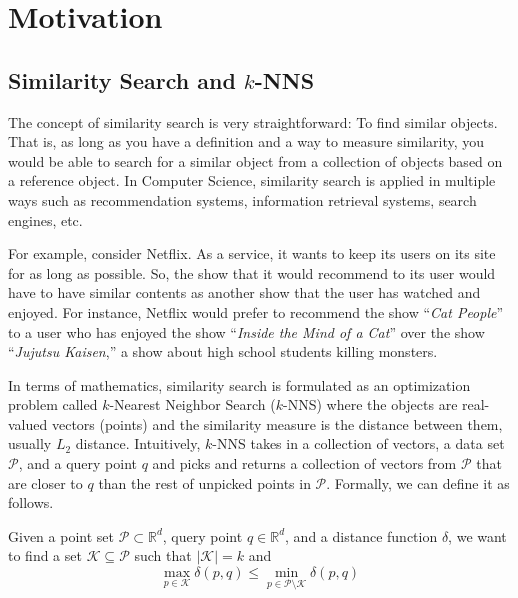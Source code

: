 \chapter{Motivation}

\section{Similarity Search and \(k\)-NNS}

The concept of similarity search is very straightforward: To find similar objects. That is, as long as you have a definition and a way to measure similarity, you would be able to search for a similar object from a collection of objects based on a reference object. In Computer Science, similarity search is applied in multiple ways such as recommendation systems, information retrieval systems, search engines, etc.

For example, consider Netflix. As a service, it wants to keep its users on its site for as long as possible. So, the show that it would recommend to its user would have to have similar contents as another show that the user has watched and enjoyed. For instance, Netflix would prefer to recommend the show ``\textit{Cat People}'' to a user who has enjoyed the show ``\textit{Inside the Mind of a Cat}'' over the show ``\textit{Jujutsu Kaisen},'' a show about high school students killing monsters.

In terms of mathematics, similarity search is formulated as an optimization problem called \(k\)-Nearest Neighbor Search (\(k\)-NNS) where the objects are real-valued vectors (points) and the similarity measure is the distance between them, usually \(L_2\) distance. Intuitively, \(k\)-NNS takes in a collection of vectors, a data set \(\mathcal{P}\), and a query point \(q\) and picks and returns a collection of vectors from \(\mathcal{P}\) that are closer to \(q\) than the rest of unpicked points in \(\mathcal{P}\). Formally, we can define it as follows.

\begin{definition}
    Given a point set \(\mathcal{P} \subset \mathbb{R}^d\), query point \(q \in \mathbb{R}^d\), and a distance function \(\delta\), we want to find a set \(\mathcal{K} \subseteq \mathcal{P}\) such that \(|\mathcal{K}| = k\) and
    \[
        \max_{p \in \mathcal{K}} \delta(p, q) \leq \min_{p \in \mathcal{P} \setminus \mathcal{K}} \delta(p, q)
    \]
\end{definition}

